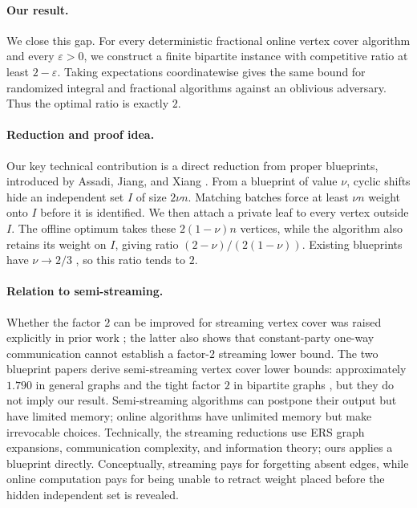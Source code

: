 \paragraph{Our result.}
We close this gap.  For every deterministic fractional online vertex cover
algorithm and every $\varepsilon>0$, we construct a finite bipartite instance
with competitive ratio at least $2-\varepsilon$.  Taking expectations
coordinatewise gives the same bound for randomized integral and fractional
algorithms against an oblivious adversary.  Thus the optimal ratio is exactly
$2$.

\paragraph{Reduction and proof idea.}
Our key technical contribution is a direct reduction from proper blueprints,
introduced by Assadi, Jiang, and Xiang \citep{AssadiJiangXiang26a}.  From a
blueprint of value $\nu$, cyclic shifts hide an independent set $I$ of size
$2\nu n$.  Matching batches force at least $\nu n$ weight onto $I$ before it is
identified.  We then attach a private leaf to every vertex outside $I$.  The
offline optimum takes these $2(1-\nu)n$ vertices, while the algorithm also
retains its weight on $I$, giving ratio $(2-\nu)/(2(1-\nu))$.  Existing
blueprints have $\nu\to 2/3$ \citep{AssadiJiangXiang26b}, so this ratio tends to
$2$.

\paragraph{Relation to semi-streaming.}
Whether the factor $2$ can be improved for streaming vertex cover was raised
explicitly in prior work \citep{AssadiEtAl19EDCS,DerakhshanEtAl25}; the latter
also shows that constant-party one-way communication cannot establish a
factor-$2$ streaming lower bound.  The two blueprint papers derive
semi-streaming vertex cover lower bounds:
approximately $1.790$ in general graphs and the tight factor $2$ in bipartite
graphs \citep{AssadiJiangXiang26a,AssadiJiangXiang26b}, but they do not imply our
result.  Semi-streaming algorithms can postpone their output but have limited
memory; online algorithms have unlimited memory but make irrevocable choices.
Technically, the streaming reductions use ERS graph expansions, communication
complexity, and information theory; ours applies a blueprint directly.
Conceptually, streaming pays for forgetting absent edges, while online
computation pays for being unable to retract weight placed before the hidden
independent set is revealed.

